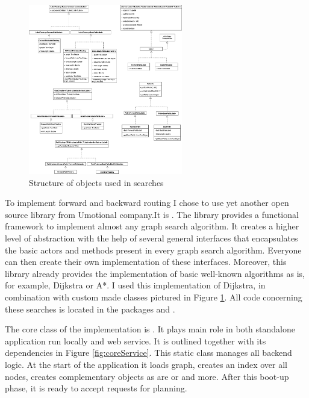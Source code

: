 \documentclass{ctuthesis}
\begin{document}
\begin{figure}
	\includegraphics[width=0.6\textwidth]{search.png}
	\caption{Structure of objects used in searches}
	\label{fig:corePlan}
\end{figure}

To implement forward and backward routing I chose to use yet another open source library from Umotional company.\footnotemark[\value{footnote}] It is . The library provides a functional framework to implement almost any graph search algorithm. It creates a higher level of abstraction with the help of several general interfaces that encapsulates the basic actors and methods present in every graph search algorithm. Everyone can then create their own implementation of these interfaces. Moreover, this library already provides the implementation of basic well-known algorithms as is, for example, Dijkstra\cite{dijkstra} or A*\cite{astar}. I used this implementation of Dijkstra, in combination with custom made classes pictured in Figure \ref{fig:corePlan}. All code concerning these searches is located in the packages  and .\par

The core class of the implementation is . It plays main role in both standalone application run locally and web service. It is outlined together with its dependencies in Figure \ref{fig:coreService}. This static class manages all backend logic. At the start of the application it loads graph, creates an index over all nodes, creates complementary objects as are  or  and more. After this boot-up phase, it is ready to accept requests for planning. \par
\end{document}
